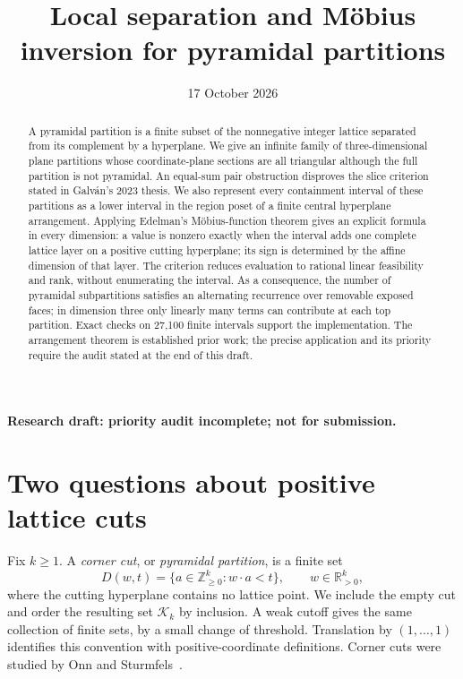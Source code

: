 \documentclass[11pt]{article}
\title{Local separation and M\"obius inversion for pyramidal partitions}
\author{}
\date{17 October 2026}
\theoremstyle{remark}
\newcommand{\K}{\mathcal K}
\newcommand{\NN}{\mathbb Z_{\geq0}}
\newcommand{\RR}{\mathbb R}
\begin{document}
\maketitle
\begin{center}
\small\textbf{Research draft: priority audit incomplete; not for submission.}
\end{center}

\begin{abstract}
A pyramidal partition is a finite subset of the nonnegative integer lattice
separated from its complement by a hyperplane. We give an infinite family of
three-dimensional plane partitions whose coordinate-plane sections are all
triangular although the full partition is not pyramidal. An equal-sum pair
obstruction disproves the slice criterion stated in Galv\'an's 2023 thesis.
We also represent every containment
interval of these partitions as a lower interval in the region poset of a finite
central hyperplane arrangement. Applying Edelman's M\"obius-function theorem
gives an explicit formula in every dimension: a value is nonzero exactly when
the interval adds one complete lattice layer on a positive cutting hyperplane;
its sign is determined by the affine dimension of that layer. The criterion
reduces evaluation to rational linear feasibility and rank, without enumerating
the interval. As a consequence, the number of pyramidal subpartitions satisfies
an alternating recurrence over removable exposed faces; in dimension three
only linearly many terms can contribute at each top partition.
Exact checks on 27,100 finite intervals support the implementation.
The arrangement theorem is established prior work; the precise application and
its priority require the audit stated at the end of this draft.
\end{abstract}

\section{Two questions about positive lattice cuts}

Fix $k\geq1$. A \emph{corner cut}, or \emph{pyramidal partition}, is a finite set
\[
 D(w,t)=\{a\in\NN^k:w\cdot a<t\},\qquad w\in\RR_{>0}^k,
\]
where the cutting hyperplane contains no lattice point. We include the empty
cut and order the resulting set $\K_k$ by inclusion. A weak cutoff gives the
same collection of finite sets, by a small change of threshold. Translation
by $(1,\ldots,1)$ identifies this convention with positive-coordinate
definitions. Corner cuts were studied by Onn and Sturmfels~\cite{OS}.
\end{document}
